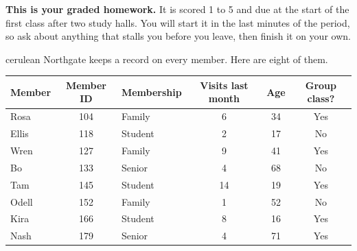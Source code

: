 \documentclass[12pt]{article}
\begin{document}

\vspace{0.12in}

\begin{remindbox}
\small
\textbf{This is your graded homework.} It is scored 1 to 5 and due at the start of the
first class after two study halls. You will start it in the last minutes of the period, so ask about anything that stalls
you before you leave, then finish it on your own.
\end{remindbox}

\vspace{0.08in}

\boxguard[20]
\begin{scenariobox}{cerulean}
Northgate keeps a record on every member. Here are eight of them.

\vspace{2pt}
\begin{center}
\small
\renewcommand{\arraystretch}{1.15}
\begin{tabular}{@{} l c l c c c @{}}
\toprule
\textbf{Member} & \textbf{Member ID} & \textbf{Membership} &
\textbf{Visits last month} & \textbf{Age} & \textbf{Group class?} \\
\midrule
Rosa  & 104 & Family  &  6 & 34 & Yes \\
Ellis & 118 & Student &  2 & 17 & No  \\
Wren  & 127 & Family  &  9 & 41 & Yes \\
Bo    & 133 & Senior  &  4 & 68 & No  \\
Tam   & 145 & Student & 14 & 19 & Yes \\
Odell & 152 & Family  &  1 & 52 & No  \\
Kira  & 166 & Student &  8 & 16 & Yes \\
Nash  & 179 & Senior  &  4 & 71 & Yes \\
\bottomrule
\end{tabular}
\end{center}
\end{scenariobox}

\vspace{0.08in}
\end{document}
